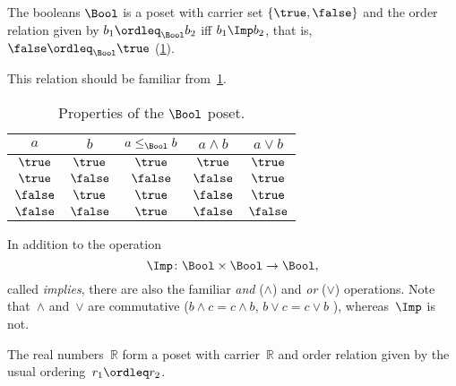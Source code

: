\begin{example}[Booleans]\label{ex:bool}
The booleans $\Bool$ is a poset with carrier set $\{\true,\false\}$ and the order relation given by $b_1 \ordleq_\Bool b_2$ iff $b_1 \Imp b_2$, that is, $\false \ordleq_\Bool \true$ (\cref{fig:boolean}).

\begin{figure}[h!]
   \centering
   \caption{\label{fig:boolean}}
\end{figure}

This relation should be familiar from~\cref{tab:boolposet}.

\begin{table}[h!]
\begin{center}
\begin{tabular}{cc|ccc}
$a$ & $b$ & $a \leq_\Bool b$ & $a \wedge b$ & $a \vee b$ \\ \hline
$\true$&$\true$&$\true$&$\true$&$\true$\\
$\true$&$\false$&$\false$&$\false$&$\true$\\
$\false$&$\true$&$\true$&$\false$&$\true$\\
$\false$&$\false$&$\true$&$\false$&$\false$
\end{tabular}
\end{center}
\caption{Properties of the $\Bool$ poset. \label{tab:boolposet}}
\end{table}

In addition to the operation 
\begin{equation*}
    \Imp\colon\Bool\times \Bool\to\Bool,
\end{equation*}
called \emph{implies}, there are also the familiar \emph{and} ($\wedge$) and \emph{or} ($\vee$) operations. Note that~$\wedge$ and~$\vee$ are commutative ($b\wedge c = c\wedge b$, $b\vee c = c\vee b$ ), whereas~$\Imp$ is not.
\end{example}




\begin{example}[Reals]
The real numbers~$\mathbb{R}$ form a poset with carrier~$\mathbb{R}$ and order relation given by the usual ordering~$r_1 \ordleq r_2$.
\end{example}

